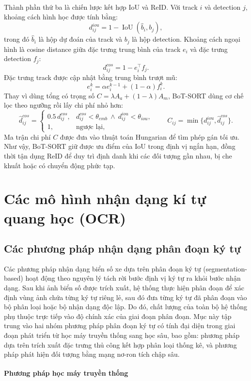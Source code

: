 \documentclass[../DoAn.tex]{subfiles}
\begin{document}
Thành phần thứ ba là chiến lược kết hợp IoU và ReID. Với track \(i\) và detection \(j\), khoảng cách hình học được tính bằng:
\[
d^{iou}_{ij}=1-\operatorname{IoU}(\hat{b}_i,b_j),
\]
trong đó \(\hat{b}_i\) là hộp dự đoán của track và \(b_j\) là hộp detection. Khoảng cách ngoại hình là cosine distance giữa đặc trưng trung bình của track \(e_i\) và đặc trưng detection \(f_j\):
\[
d^{cos}_{ij}=1-e_i^\top f_j.
\]
Đặc trưng track được cập nhật bằng trung bình trượt mũ:
\[
e_i^k=\alpha e_i^{k-1}+(1-\alpha)f_i^k.
\]
Thay vì dùng tổng có trọng số \(C=\lambda A_a+(1-\lambda)A_m\), BoT-SORT dùng cơ chế lọc theo ngưỡng rồi lấy chi phí nhỏ hơn:
\[
\hat{d}^{cos}_{ij}=
\begin{cases}
0.5\,d^{cos}_{ij}, & d^{cos}_{ij}<\theta_{emb}\ \land\ d^{iou}_{ij}<\theta_{iou},\\
1, & \text{ngược lại},
\end{cases}
\qquad
C_{ij}=\min\{d^{iou}_{ij},\hat{d}^{cos}_{ij}\}.
\]
Ma trận chi phí \(C\) được đưa vào thuật toán Hungarian để tìm phép gán tối ưu. Như vậy, BoT-SORT giữ được ưu điểm của IoU trong định vị ngắn hạn, đồng thời tận dụng ReID để duy trì định danh khi các đối tượng gần nhau, bị che khuất hoặc có chuyển động phức tạp.

\section{Các mô hình nhận dạng kí tự quang học (OCR)}
\label{section:2.5}

\subsection{Các phương pháp nhận dạng phân đoạn ký tự}
\label{subsection:2.5.1}
Các phương pháp nhận dạng biển số xe dựa trên phân đoạn ký tự (segmentation-based) hoạt động theo nguyên lý tách rời bước định vị ký tự ra khỏi bước nhận dạng. Sau khi ảnh biển số được trích xuất, hệ thống thực hiện phân đoạn để xác định vùng ảnh chứa từng ký tự riêng lẻ, sau đó đưa từng ký tự đã phân đoạn vào bộ phân loại hoặc bộ nhận dạng độc lập. Do đó, chất lượng của toàn bộ hệ thống phụ thuộc trực tiếp vào độ chính xác của giai đoạn phân đoạn. Mục này tập trung vào hai nhóm phương pháp phân đoạn ký tự có tính đại diện trong giai đoạn phát triển từ học máy truyền thống sang học sâu, bao gồm: phương pháp dựa trên trích xuất đặc trưng thủ công kết hợp phân loại thống kê, và phương pháp phát hiện đối tượng bằng mạng nơ-ron tích chập sâu.

\paragraph{Phương pháp học máy truyền thống}
\end{document}
